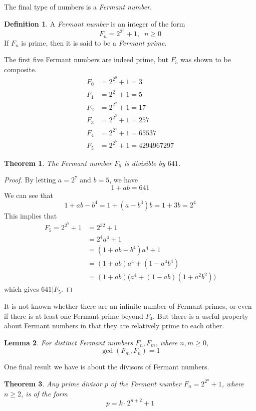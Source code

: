 \documentclass{article}
\newtheorem{theorem}{Theorem}[section]
\newtheorem{lemma}[theorem]{Lemma}
\theoremstyle{remark}
\theoremstyle{definition}
\newtheorem{definition}{Definition}[section]
\begin{document}
The final type of numbers is a \textit{Fermant number}. 

\begin{definition}
A \textit{Fermant number} is an integer of the form
\[F_n = 2^{2^n} + 1, \;\; n \geq 0\]
If $F_n$ is prime, then it is said to be a \textit{Fermant prime}. 
\end{definition}

The first five Fermant numbers are indeed prime, but $F_5$ was shown to be composite. 
\begin{align*}
    F_0 &= 2^{2^0} + 1 = 3 \\
    F_1 &= 2^{2^1} + 1 = 5 \\
    F_2 &= 2^{2^2} + 1 = 17 \\
    F_3 &= 2^{2^3} + 1 = 257 \\
    F_4 &= 2^{2^4} + 1 = 65537 \\
    F_5 &= 2^{2^5} + 1 = 4294967297
\end{align*}

\begin{theorem}
The Fermant number $F_5$ is divisible by $641$. 
\end{theorem}
\begin{proof}
By letting $a = 2^7$ and $b = 5$, we have 
\[1 + ab = 641\]
We can see that
\[1 + ab - b^4 = 1 + (a-b^3) b = 1 + 3b = 2^4\]
This implies that 
\begin{align*}
    F_5 = 2^{2^5} + 1 & = 2^{32} + 1 \\
    & = 2^4 a^4 + 1\\
    & = (1+ab-b^4) a^4 + 1 \\
    & = (1+ab) a^4 + (1-a^4 b^4) \\
    & = (1+ab) \big( a^4 + (1-ab)(1+a^2 b^2)\big)
\end{align*}
which gives $641 | F_5$. 
\end{proof}

It is not known whether there are an infinite number of Fermant primes, or even if there is at least one Fermant prime beyond $F_4$. But there is a useful property about Fermant numbers in that they are relatively prime to each other. 

\begin{lemma}
For distinct Fermant numbers $F_n, F_m$, where $n,m \geq 0$, 
\[\gcd(F_m, F_n) = 1\]
\end{lemma}

One final result we have is about the divisors of Fermant numbers. 

\begin{theorem}
Any prime divisor $p$ of the Fermant number $F_n = 2^{2^n} + 1$, where $n \geq 2$, is of the form
\[p = k \cdot 2^{n+2} + 1\]
\end{theorem}
\end{document}
